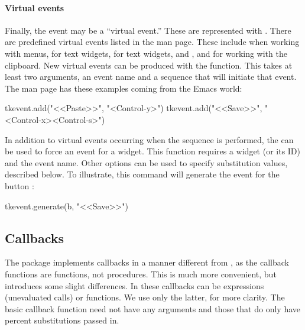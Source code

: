 \paragraph{Virtual events}
Finally, the event may be a ``virtual event.'' These are represented
with . There are predefined virtual
events listed in the  man page. These include
 when working with menus,
 for text widgets,
 for text widgets, and
,  and
 for working with the clipboard. New
virtual events can be produced with the 
function. This takes at least two arguments, an event name and a
sequence that will initiate that event. The  man page has
these examples coming from the Emacs world:
\begin{Schunk}
\begin{Sinput}
  tkevent.add("<<Paste>>", "<Control-y>")
  tkevent.add("<<Save>>", "<Control-x><Control-s>")
\end{Sinput}
\end{Schunk}
%
In addition to virtual events occurring when the sequence is performed,
the  can be used to force an event for a
widget. This function requires a widget (or its ID) and the event
name. Other options can be used to specify substitution values,
described below. To illustrate, this command will generate the
 event for the button :
\begin{Schunk}
\begin{Sinput}
 tkevent.generate(b, "<<Save>>")
\end{Sinput}
\end{Schunk}
%



\subsection{Callbacks}
\label{sec:tcltk:callbacks}

The  package implements callbacks in a manner different
from \TK, as the callback functions are \R\/ functions, not \TK\/
procedures. This is much more convenient, but introduces some slight
differences.  In  these callbacks can be expressions
(unevaluated calls) or functions. We use only the latter, for more
clarity. The basic callback function need not have any arguments and
those that do only have percent substitutions passed in.


